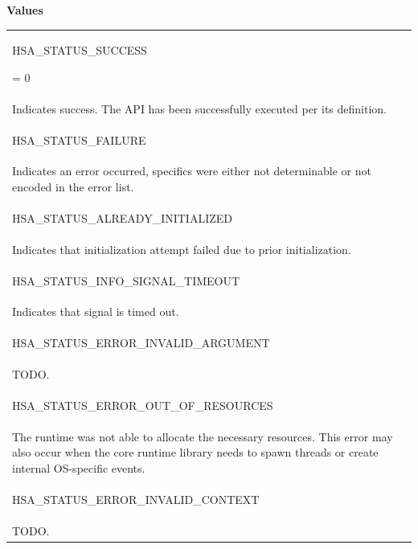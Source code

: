 \documentclass[final]{book}
\newcommand{\reftyp}[1]{#1}
\newcommand{\refenu}[1]{\reftyp{#1}}
\begin{document}
\begin{appendices}
\noindent\textbf{Values}\\[-5mm]
\begin{longtable}{@{\hspace{2em}}p{\linewidth-2em}}
\hspace{-2em}\hypertarget{group--status-1ggad755322e7ff95456520e8abdbe90d225ae382ea0c9c05cce5a60d0317375159cc}{\refenu{HSA_STATUS_SUCCESS}} = 0\\Indicates success. The API has been successfully executed per its definition.\\[2mm]
\hspace{-2em}\hypertarget{group--status-1ggad755322e7ff95456520e8abdbe90d225a49e95a9eebe62315fa4c80e699b68eeb}{\refenu{HSA_STATUS_FAILURE}} \\Indicates an error occurred, specifics were either not determinable or not encoded in the error list.\\[2mm]
\hspace{-2em}\hypertarget{group--status-1ggad755322e7ff95456520e8abdbe90d225a10496aec7462cb613a5aa589510cacc9}{\refenu{HSA_STATUS_ALREADY_INITIALIZED}} \\Indicates that initialization attempt failed due to prior initialization.\\[2mm]
\hspace{-2em}\hypertarget{group--status-1ggad755322e7ff95456520e8abdbe90d225a96e987aac8207e7a0f92fb8a8d73b91e}{\refenu{HSA_STATUS_INFO_SIGNAL_TIMEOUT}} \\Indicates that signal is timed out.\\[2mm]
\hspace{-2em}\hypertarget{group--status-1ggad755322e7ff95456520e8abdbe90d225ac7d3651f75107d2a6a8ba3b25683c030}{\refenu{HSA_STATUS_ERROR_INVALID_ARGUMENT}} \\TODO.\\[2mm]
\hspace{-2em}\hypertarget{group--status-1ggad755322e7ff95456520e8abdbe90d225a1a77fcf36d0d140874c4361ab093eff7}{\refenu{HSA_STATUS_ERROR_OUT_OF_RESOURCES}} \\The runtime was not able to allocate the necessary resources. This error may also occur when the core runtime library needs to spawn threads or create internal OS-specific events.\\[2mm]
\hspace{-2em}\hypertarget{group--status-1ggad755322e7ff95456520e8abdbe90d225a7bd6aaae8ecaaaea4c0d12e406e13b53}{\refenu{HSA_STATUS_ERROR_INVALID_CONTEXT}} \\TODO.\\[2mm]

\end{longtable}
\end{appendices}
\end{document}
